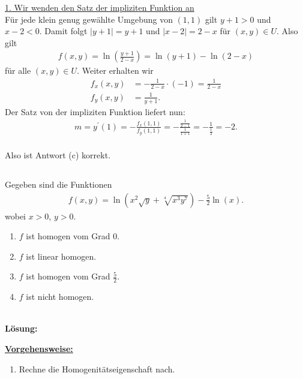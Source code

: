 \underline{1. Wir wenden den Satz der impliziten Funktion an}\\
Für jede klein genug gewählte Umgebung von $ (1,1) $ gilt $ y+ 1>0 $ und $ x-2 < 0 $.
Damit folgt $ |y+1| = y+ 1 $ und $ |x-2| = 2-x $ für $ (x,y) \in U $.
Also gilt
\begin{align*}
f(x,y) = \ln \left(\frac{y+1}{2-x}\right)
= \ln(y+1) - \ln(2-x)
\end{align*}
für alle  $ (x,y) \in U $. Weiter erhalten wir 
\begin{align*}
f_x(x,y) &= -\frac{1}{2-x} \cdot (-1)=  \frac{1}{2-x}\\
f_y(x,y) &= \frac{1}{y+1}.
\end{align*}
Der Satz von der impliziten Funktion liefert nun:
\begin{align*}
m = y^\prime(1) =
-\frac{f_x(1,1)}{f_y(1,1)} 
=
- \frac{\frac{1}{2-1}}{\frac{1}{1+1}}
= - \frac{1}{\frac{1}{2}} = -2.
\end{align*}
\ \\
Also ist Antwort (c) korrekt.



\newpage



\subsection*{}
Gegeben sind die Funktionen
\begin{align*}
f(x,y) =  \ln
\left( x^2 \sqrt{y} + \sqrt[4]{x^3 y^7}\right) - \frac{5}{2} \ln(x).
\end{align*}
wobei $ x> 0 $, $ y >0  $.
\renewcommand{\labelenumi}{(\alph{enumi})}
\begin{enumerate}
	\item
	$ f $ ist homogen vom Grad $ 0 $.
	
	\item 
	$ f $ ist linear homogen.
	\item
	$ f $ ist homogen vom Grad $ \frac{5}{2} $.
	\item
	$ f $ ist nicht homogen.
\end{enumerate}
\ \\
\textbf{Lösung:}
\begin{mdframed}
\underline{\textbf{Vorgehensweise:}}
\renewcommand{\labelenumi}{\theenumi.}
\begin{enumerate}
\item Rechne die Homogenitätseigenschaft nach.
\end{enumerate}
\end{mdframed}

